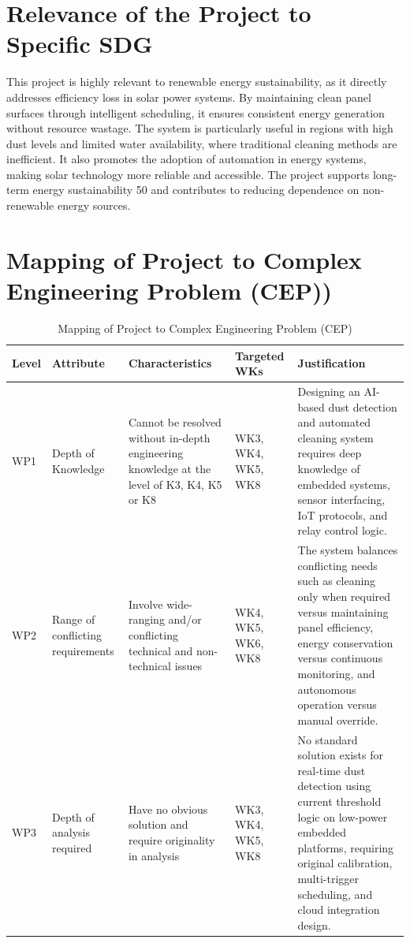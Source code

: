 \documentclass[10pt]{report}
\begin{document}
\begin{sloppypar}
{{{\begin{sloppypar}
\section{Relevance of the Project to Specific SDG}
\hspace{0.5cm}
This project is highly relevant to renewable energy sustainability, as it directly addresses efficiency loss in solar power systems. By maintaining clean panel surfaces
through intelligent scheduling, it ensures consistent energy generation without resource wastage. The system is particularly useful in regions with high dust levels and
limited water availability, where traditional cleaning methods are inefficient. It also
promotes the adoption of automation in energy systems, making solar technology
more reliable and accessible. The project supports long-term energy sustainability
50
and contributes to reducing dependence on non-renewable energy sources.


\section{Mapping of Project to Complex Engineering Problem (CEP))}
\hspace{0.5cm}

\begin{table}[H]
\centering
\renewcommand{\arraystretch}{2.2}
\begin{tabular}{|p{1.0cm}|p{2.8cm}|p{3.8cm}|p{2.0cm}|p{4.2cm}|}
\hline
\textbf{Level} & \textbf{Attribute} & \textbf{Characteristics} & \textbf{Targeted WKs} & \textbf{Justification} \\
\hline
WP1 & Depth of Knowledge &
Cannot be resolved without in-depth engineering knowledge at the level of K3, K4, K5 or K8 &
WK3, WK4, WK5, WK8 &
Designing an AI-based dust detection and automated cleaning system requires deep knowledge of embedded systems, sensor interfacing, IoT protocols, and relay control logic. \\
\hline
WP2 & Range of conflicting requirements &
Involve wide-ranging and/or conflicting technical and non-technical issues &
WK4, WK5, WK6, WK8 &
The system balances conflicting needs such as cleaning only when required versus maintaining panel efficiency, energy conservation versus continuous monitoring, and autonomous operation versus manual override. \\
\hline
WP3 & Depth of analysis required &
Have no obvious solution and require originality in analysis &
WK3, WK4, WK5, WK8 &
No standard solution exists for real-time dust detection using current threshold logic on low-power embedded platforms, requiring original calibration, multi-trigger scheduling, and cloud integration design. \\
\hline
\end{tabular}
\caption{Mapping of Project to Complex Engineering Problem (CEP)}
\label{tab:cep}
\end{table}



\end{sloppypar}}}}
\end{sloppypar}
\end{document}

